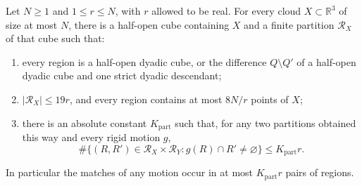 \begin{lemma}
\label{mot:partition}
Let \(N\ge1\) and \(1\le r\le N\), with \(r\) allowed to be
real.  For every cloud \(X\subset\mathbb R^3\) of size at most
\(N\), there is a half-open cube containing \(X\) and a finite
partition \(\mathcal R_X\) of that cube such that:
\begin{enumerate}
\item every region is a half-open dyadic cube, or the difference
\(Q\setminus Q'\) of a half-open dyadic cube and one strict
dyadic descendant;
\item \(|\mathcal R_X|\le19r\), and every region contains at most
\(8N/r\) points of \(X\);
\item there is an absolute constant \(K_{\mathrm{part}}\) such
that, for any two partitions obtained this way and every rigid
motion \(g\),
\[
 \#\{(R,R')\in\mathcal R_X\times\mathcal R_Y:
                         g(R)\cap R'\ne\varnothing\}
 \le K_{\mathrm{part}}r.
\]
\end{enumerate}
In particular the matches of any motion occur in at most
\(K_{\mathrm{part}}r\) pairs of regions.
\end{lemma}

